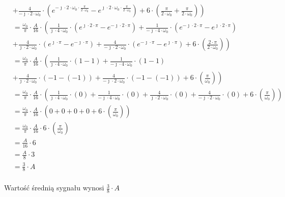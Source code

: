 \begin{align*}
&\left.+\frac{4}{-\jmath \cdot 2 \cdot \omega_0} \cdot \left( e^{-\jmath \cdot 2 \cdot \omega_0 \cdot \frac{\pi}{2\cdot\omega_0}} - e^{\jmath \cdot 2 \cdot \omega_0 \cdot \frac{\pi}{2\cdot\omega_0}}\right) + 6 \cdot  \left( \frac{\pi}{2\cdot\omega_0} + \frac{\pi}{2\cdot\omega_0} \right)\right)\\
&=\frac{\omega_0}{\pi} \cdot \frac{A}{16} \cdot \left(\frac{1}{\jmath \cdot 4 \cdot \omega_0} \cdot \left( e^{\jmath \cdot 2 \cdot \pi} - e^{-\jmath \cdot 2 \cdot \pi}\right) +\frac{1}{-\jmath \cdot 4 \cdot \omega_0}\cdot \left( e^{-\jmath \cdot 2 \cdot \pi} - e^{\jmath \cdot 2 \cdot \pi}\right)\right.\\
&\left. +\frac{4}{\jmath \cdot 2 \cdot \omega_0}\cdot \left( e^{\jmath \cdot \pi} - e^{-\jmath \cdot \pi}\right) +\frac{4}{-\jmath \cdot 2 \cdot \omega_0} \cdot \left( e^{-\jmath \cdot \pi} - e^{\jmath \cdot \pi}\right) + 6 \cdot  \left( \frac{2 \cdot \pi}{2\cdot\omega_0} \right)\right)\\
&=\frac{\omega_0}{\pi} \cdot \frac{A}{16} \cdot \left(\frac{1}{\jmath \cdot 4 \cdot \omega_0} \cdot \left( 1 - 1\right) +\frac{1}{-\jmath \cdot 4 \cdot \omega_0}\cdot \left( 1 - 1\right)\right.\\
&\left. +\frac{4}{\jmath \cdot 2 \cdot \omega_0}\cdot \left( -1 - (-1)\right) +\frac{4}{-\jmath \cdot 2 \cdot \omega_0} \cdot \left(-1 - (-1)\right) + 6 \cdot  \left( \frac{\pi}{\omega_0} \right)\right)\\
&=\frac{\omega_0}{\pi} \cdot \frac{A}{16} \cdot \left(\frac{1}{\jmath \cdot 4 \cdot \omega_0} \cdot \left( 0\right) +\frac{1}{-\jmath \cdot 4 \cdot \omega_0}\cdot \left( 0\right) +\frac{4}{\jmath \cdot 2 \cdot \omega_0}\cdot \left( 0\right) +\frac{4}{-\jmath \cdot 2 \cdot \omega_0} \cdot \left(0\right) + 6 \cdot  \left( \frac{\pi}{\omega_0} \right)\right)\\
&=\frac{\omega_0}{\pi} \cdot \frac{A}{16} \cdot \left(0 +0 +0 +0 + 6 \cdot  \left( \frac{\pi}{\omega_0} \right)\right)\\
&=\frac{\omega_0}{\pi} \cdot \frac{A}{16} \cdot 6 \cdot  \left( \frac{\pi}{\omega_0} \right)\\
&= \frac{A}{16} \cdot 6\\
&= \frac{A}{8} \cdot 3\\
&= \frac{3}{8} \cdot A\\
\end{align*}

Wartość średnią sygnału wynosi $\frac{3}{8} \cdot A$
\newpage
